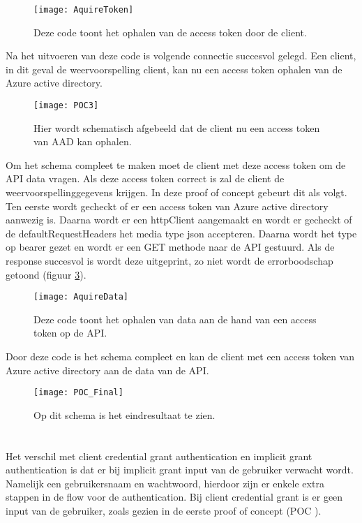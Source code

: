 \begin{figure}[H]
	\centering
	\texttt{[image: AquireToken]} 
	\caption[AuthConfig]{Deze code toont het ophalen van de access token door de client.}
	\label{fig:aquireToken}
\end{figure}\newpage
Na het uitvoeren van deze code is volgende connectie succesvol gelegd. Een client, in dit geval de weervoorspelling client, kan nu een access token ophalen van de Azure active directory.
\begin{figure}[H]
	\centering
	\texttt{[image: POC3]} 
	\caption[POC3]{Hier wordt schematisch afgebeeld dat de client nu een access token van AAD kan ophalen.}
	\label{fig:poc3}
\end{figure}
Om het schema compleet te maken moet de client met deze access token om de API data vragen. Als deze access token correct is zal de client de weervoorspellinggegevens krijgen. In deze proof of concept gebeurt dit als volgt.\newline
Ten eerste wordt gecheckt of er een access token van Azure active directory aanwezig is. Daarna wordt er een httpClient aangemaakt en wordt er gecheckt of de defaultRequestHeaders het media type json accepteren. Daarna wordt het  type op bearer gezet en wordt er een GET methode naar de API gestuurd. Als de response succesvol is wordt deze uitgeprint, zo niet wordt de errorboodschap getoond (figuur \ref{fig:aquireData}).
\begin{figure}[H]
	\centering
	\texttt{[image: AquireData]} 
	\caption[AquireData]{Deze code toont het ophalen van data aan de hand van een access token op de API.}
	\label{fig:aquireData}
\end{figure}\newpage
Door deze code is het schema compleet en kan de client met een access token van Azure active directory aan de data van de API.
\begin{figure}[H]
	\centering
	\texttt{[image: POC\_Final]} 
	\caption[POCFinal2]{Op dit schema is het eindresultaat te zien.}
	\label{fig:pocfinal2}
\end{figure}
\section{}
\label{sec:Microsift_signon}
Het verschil met client credential grant authentication en implicit grant authentication is dat er bij implicit grant input van de gebruiker verwacht wordt. Namelijk een gebruikersnaam en wachtwoord, hierdoor zijn er enkele extra stappen in de flow voor de authentication. Bij client credential grant is er geen input van de gebruiker, zoals gezien in de eerste proof of concept (POC \cite{Verlinde2020}).
